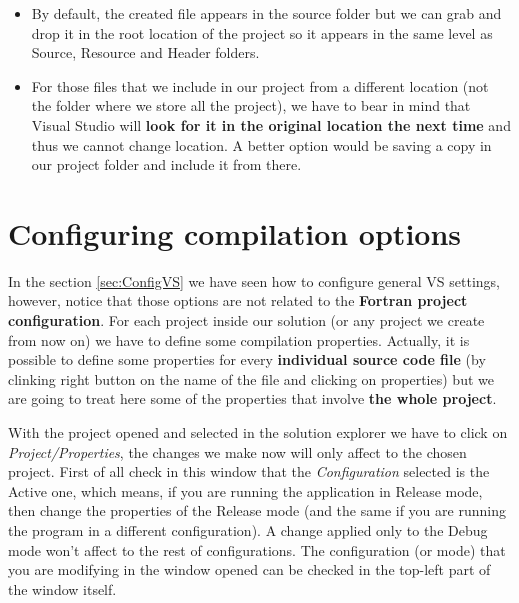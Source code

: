 \begin{IN}
    \begin{itemize}     
        \item By default, the created file appears in the source folder but we can grab and drop it in the root location of the project so it appears in the same level as Source, Resource and Header folders. 
        \item For those files that we include in our project from a different location (not the folder where we store all the project), we have to bear in mind that Visual Studio will \textbf{look for it in the original location the next time} and thus we cannot change location. A better option would be saving a copy in our project folder and include it from there.
    \end{itemize}
\end{IN}



    \FloatBarrier
    \section{Configuring compilation options}
    
In the section \ref{sec:ConfigVS} we have seen how to configure general VS settings, however, notice that those options are not related to the \textbf{Fortran project configuration}. For each project inside our solution (or any project we create from now on) we have to define some compilation properties. Actually, it is possible to define some properties for every \textbf{individual source code file} (by clinking right button on the name of the file and clicking on properties) but we are going to treat here some of the properties that involve \textbf{the whole project}.

With the project opened and selected in the solution explorer we have to click on \textit{Project/Properties}, the changes we make now will only affect to the chosen project. First of all check in this window that the \textit{Configuration} selected is the Active one, which means, if you are running the application in Release mode, then change the properties of the Release mode (and the same if you are running the program in a different configuration). A change applied only to the Debug mode won't affect to the rest of configurations. The configuration (or mode) that you are modifying in the window opened can be checked in the top-left part of the window itself. 

